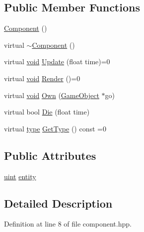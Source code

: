\subsection*{Public Member Functions}
\begin{DoxyCompactItemize}
\item 
\hyperlink{class_component_a8775db6d1a2c1afc2e77cd3c8f39da6f}{Component} ()
\item 
virtual \hyperlink{class_component_a2e9aa4348314d981f05f67397ad2f872}{$\sim$\-Component} ()
\item 
virtual \hyperlink{_s_d_l__opengles2__gl2ext_8h_ae5d8fa23ad07c48bb609509eae494c95}{void} \hyperlink{class_component_a20c791684d452b36fcce40ac9038c735}{Update} (float time)=0
\item 
virtual \hyperlink{_s_d_l__opengles2__gl2ext_8h_ae5d8fa23ad07c48bb609509eae494c95}{void} \hyperlink{class_component_a0c67ccdaf754b96520e3428284a74a7f}{Render} ()=0
\item 
virtual \hyperlink{_s_d_l__opengles2__gl2ext_8h_ae5d8fa23ad07c48bb609509eae494c95}{void} \hyperlink{class_component_af6a505dae181fc1a3498b779a4bd162e}{Own} (\hyperlink{class_game_object}{Game\-Object} $\ast$go)
\item 
virtual bool \hyperlink{class_component_adf7c2452a79ee10d2d1f658d6df5b0ff}{Die} (float time)
\item 
virtual \hyperlink{class_component_ad6d161b6acf7b843b55bb9feac7af71a}{type} \hyperlink{class_component_a1440354c23703096a6439d45ab85e4fd}{Get\-Type} () const =0
\end{DoxyCompactItemize}
\subsection*{Public Attributes}
\begin{DoxyCompactItemize}
\item 
\hyperlink{common_8hpp_a69aa29b598b851b0640aa225a9e5d61d}{uint} \hyperlink{class_component_a98c878b6e50bd78de3882e44bf3332e0}{entity}
\end{DoxyCompactItemize}


\subsection{Detailed Description}


Definition at line 8 of file component.\-hpp.



